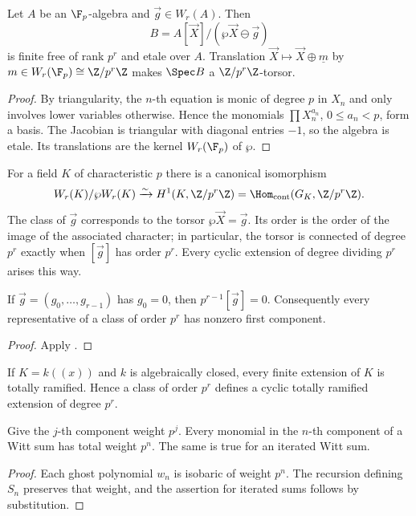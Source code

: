 \begin{lemma}\label{lemma:asw_etale_torsor}
Let $A$ be an $\F_p$-algebra and $\vec g\in W_r(A)$. Then
\[
 B=A[\vec X]/(\wp\vec X\ominus\vec g)
\]
is finite free of rank $p^r$ and etale over $A$. Translation
$\vec X\mapsto\vec X\oplus\underline m$ by
$m\in W_r(\F_p)\cong\Z/p^r\Z$ makes $\Spec B$ a $\Z/p^r\Z$-torsor.
\end{lemma}
\begin{proof}
By triangularity, the $n$-th equation is monic of degree $p$ in $X_n$ and
only involves lower variables otherwise. Hence the monomials
$\prod X_n^{a_n}$, $0\leq a_n<p$, form a basis. The Jacobian is triangular
with diagonal entries $-1$, so the algebra is etale. Its translations are the
kernel $W_r(\F_p)$ of $\wp$.
\end{proof}

\begin{theorem}
\label{theorem:asw_theory}
For a field $K$ of characteristic $p$ there is a canonical isomorphism
\[
 W_r(K)/\wp W_r(K)\xrightarrow{\sim}
 H^1(K,\Z/p^r\Z)=\Hom_{\mathrm{cont}}(G_K,\Z/p^r\Z).
\]
The class of $\vec g$ corresponds to the torsor
$\wp\vec X=\vec g$. Its order is the order of the image of the associated
character; in particular, the torsor is connected of degree $p^r$ exactly
when $[\vec g]$ has order $p^r$. Every cyclic extension of degree dividing
$p^r$ arises this way.
\end{theorem}

\begin{cor}\label{cor:asw_class_order_and_first_component}
If $\vec g=(g_0,\dots,g_{r-1})$ has $g_0=0$, then $p^{r-1}[\vec g]=0$.
Consequently every representative of a class of order $p^r$ has nonzero
first component.
\end{cor}
\begin{proof}
Apply .
\end{proof}

\begin{rem*}\label{rem:asw_local_totally_ramified}
If $K=k((x))$ and $k$ is algebraically closed, every finite extension of $K$
is totally ramified. Hence a class of order $p^r$ defines a cyclic totally
ramified extension of degree $p^r$.
\end{rem*}

\begin{lemma}\label{lemma:witt_addition_isobaric}
Give the $j$-th component weight $p^j$. Every monomial in the $n$-th component
of a Witt sum has total weight $p^n$. The same is true for an iterated Witt
sum.
\end{lemma}
\begin{proof}
Each ghost polynomial $w_n$ is isobaric of weight $p^n$. The recursion defining
$S_n$ preserves that weight, and the assertion for iterated sums follows by
substitution.
\end{proof}

